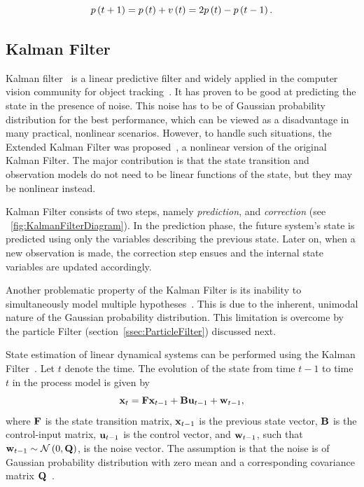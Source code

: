 \begin{equation}
    \label{eq:TrivialMotionModel}
    {p} \left( t + 1 \right) = {p} \left( t \right) + {v} \left( t \right) = 2{p} \left( t \right) - {p} \left( t - 1 \right).
\end{equation}

\subsection{Kalman Filter}
\label{ssec:KalmanFiler}

Kalman filter~\cite{kalman1960linearfilter, welch1995introduction} is a linear predictive filter and widely applied in the computer vision community for object tracking~\cite{jalal2012sotavot}. It has proven to be good at predicting the state in the presence of noise. This noise has to be of Gaussian probability distribution for the best performance, which can be viewed as a disadvantage in many practical, nonlinear scenarios. However, to handle such situations, the Extended Kalman Filter was proposed~\cite{welch1995introduction}, a nonlinear version of the original Kalman Filter. The major contribution is that the state transition and observation models do not need to be linear functions of the state, but they may be nonlinear instead.

Kalman Filter consists of two steps, namely \emph{prediction}, and \emph{correction} (see \figstr{}~\ref{fig:KalmanFilterDiagram}). In the prediction phase, the future system's state is predicted using only the variables describing the previous state. Later on, when a new observation is made, the correction step ensues and the internal state variables are updated accordingly.

Another problematic property of the Kalman Filter is its inability to simultaneously model multiple hypotheses~\cite{welch1995introduction}. This is due to the inherent, unimodal nature of the Gaussian probability distribution. This limitation is overcome by the particle Filter (section~\ref{ssec:ParticleFilter}) discussed next.

State estimation of linear dynamical systems can be performed using the Kalman Filter~\cite{kim2018introduction}. Let $t$ denote the time. The evolution of the state from time $t - 1$ to time $t$ in the process model is given by
\begin{equation}
    \mathbf{x}_t = \mathbf{F} \mathbf{x}_{t - 1} + \mathbf{B} \mathbf{u}_{t - 1} + \mathbf{w}_{t - 1},
\end{equation}
where $\mathbf{F}$ is the state transition matrix, $\mathbf{x}_{t - 1}$ is the previous state vector, $\mathbf{B}$ is the control-input matrix, $\mathbf{u}_{t - 1}$ is the control vector, and $\mathbf{w}_{t - 1}$, such that $\mathbf{w}_{t - 1} \sim \mathcal{N} \left( {0, \mathbf{Q}} \right)$, is the noise vector. The assumption is that the noise is of Gaussian probability distribution with zero mean and a corresponding covariance matrix $\mathbf{Q}$~\cite{kim2018introduction}.

